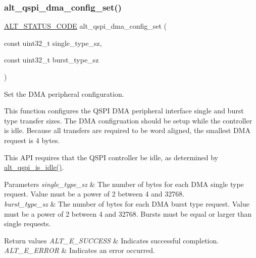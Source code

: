 \subsubsection{\texorpdfstring{alt\_qspi\_dma\_config\_set()}{alt\_qspi\_dma\_config\_set()}}
{\footnotesize\ttfamily \mbox{\hyperlink{hwlib_8h_abdb0d369f069723ca55d6c94bcaaaa12}{A\+L\+T\+\_\+\+S\+T\+A\+T\+U\+S\+\_\+\+C\+O\+DE}} alt\+\_\+qspi\+\_\+dma\+\_\+config\+\_\+set (\begin{DoxyParamCaption}\item[{const uint32\+\_\+t}]{single\+\_\+type\+\_\+sz,  }\item[{const uint32\+\_\+t}]{burst\+\_\+type\+\_\+sz }\end{DoxyParamCaption})}

Set the D\+MA peripheral configuration.

This function configures the Q\+S\+PI D\+MA peripheral interface single and burst type transfer sizes. The D\+MA configruation should be setup while the controller is idle. Because all transfers are required to be word aligned, the smallest D\+MA request is 4 bytes.

This A\+PI requires that the Q\+S\+PI controller be idle, as determined by \mbox{\hyperlink{group__ALT__QSPI__CSR_gaeaa7e762d8b79b1989385c978174b7b8}{alt\+\_\+qspi\+\_\+is\+\_\+idle()}}.


\begin{DoxyParams}{Parameters}
{\em single\+\_\+type\+\_\+sz} & The number of bytes for each D\+MA single type request. Value must be a power of 2 between 4 and 32768.\\
\hline
{\em burst\+\_\+type\+\_\+sz} & The number of bytes for each D\+MA burst type request. Value must be a power of 2 between 4 and 32768. Bursts must be equal or larger than single requests.\\
\hline
\end{DoxyParams}

\begin{DoxyRetVals}{Return values}
{\em A\+L\+T\+\_\+\+E\+\_\+\+S\+U\+C\+C\+E\+SS} & Indicates successful completion. \\
\hline
{\em A\+L\+T\+\_\+\+E\+\_\+\+E\+R\+R\+OR} & Indicates an error occurred. \\
\hline
\end{DoxyRetVals}
\mbox{\label{group__ALT__QSPI__DMA_ga4d16f0e1e367185438c882b1e54ad69a}} 
